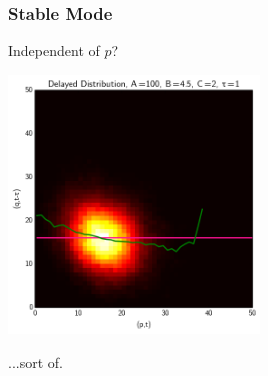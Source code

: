 \documentclass[xcolor={usenames,dvipsnames,svgnames}]{beamer}
\begin{document}
\begin{frame}
    \frametitle{Stable Mode}
    Independent of $p$?

    \begin{center}
        \includegraphics[width=0.5\textwidth]{../results/presentation/ddjd-ca-a100-c2-t1-flat.png}
    \end{center}

    ...sort of.

\end{frame}
\end{document}
